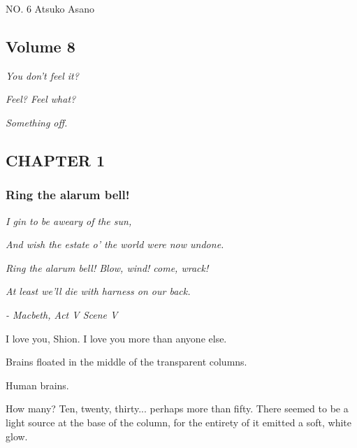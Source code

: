 \protect\hypertarget{titlepage.xhtml}{}{}

\protect\hypertarget{index_split_000.html}{}{}

NO. 6 \textbar{} Atsuko Asano

\protect\hypertarget{index_split_002_split_000.html}{}{}

\hypertarget{index_split_002_split_000.htmlux5cux23calibre_pb_0}{%
\subsection{Volume
8}\label{index_split_002_split_000.htmlux5cux23calibre_pb_0}}

\protect\hypertarget{index_split_002_split_001.html}{}{}

\emph{You don't feel it?}

\emph{Feel? Feel what?}

\emph{Something off.}

\hypertarget{index_split_002_split_001.htmlux5cux23calibre_pb_1}{}

\hypertarget{index_split_002_split_001.htmlux5cux23calibre_pb_0}{}

\protect\hypertarget{index_split_002_split_002.html}{}{}

\hypertarget{index_split_002_split_002.htmlux5cux23calibre_toc_2}{%
\subsection{CHAPTER
1}\label{index_split_002_split_002.htmlux5cux23calibre_toc_2}}

\subsubsection{Ring the alarum bell!}

\emph{I gin to be aweary of the sun,}

\emph{And wish the estate o' the world were now undone.}

\emph{Ring the alarum bell! Blow, wind! come, wrack!}

\emph{At least we'll die with harness on our back.~}

\emph{- Macbeth, Act V Scene V}

I love you, Shion. I love you more than anyone else.

Brains floated in the middle of the transparent columns.

Human brains.

How many? Ten, twenty, thirty... perhaps more than fifty. There seemed
to be a light source at the base of the column, for the entirety of it
emitted a soft, white glow.

